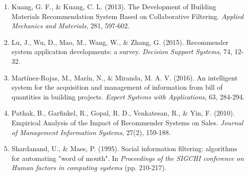 \documentclass[twocolumn]{article}
\begin{document}
\begin{enumerate}
    \item Kuang, G. F., \& Kuang, C. L. (2013). The Development of Building Materials Recommendation System Based on Collaborative Filtering. \textit{Applied Mechanics and Materials}, 281, 597-602.

    \item Lu, J., Wu, D., Mao, M., Wang, W., \& Zhang, G. (2015). Recommender system application developments: a survey. \textit{Decision Support Systems}, 74, 12-32.

    \item Martínez-Rojas, M., Marín, N., \& Miranda, M. A. V. (2016). An intelligent system for the acquisition and management of information from bill of quantities in building projects. \textit{Expert Systems with Applications}, 63, 284-294.

    \item Pathak, B., Garfinkel, R., Gopal, R. D., Venkatesan, R., \& Yin, F. (2010). Empirical Analysis of the Impact of Recommender Systems on Sales. \textit{Journal of Management Information Systems}, 27(2), 159-188.

    \item Shardanand, U., \& Maes, P. (1995). Social information filtering: algorithms for automating "word of mouth". In \textit{Proceedings of the SIGCHI conference on Human factors in computing systems} (pp. 210-217).


\end{enumerate}
\end{document}
